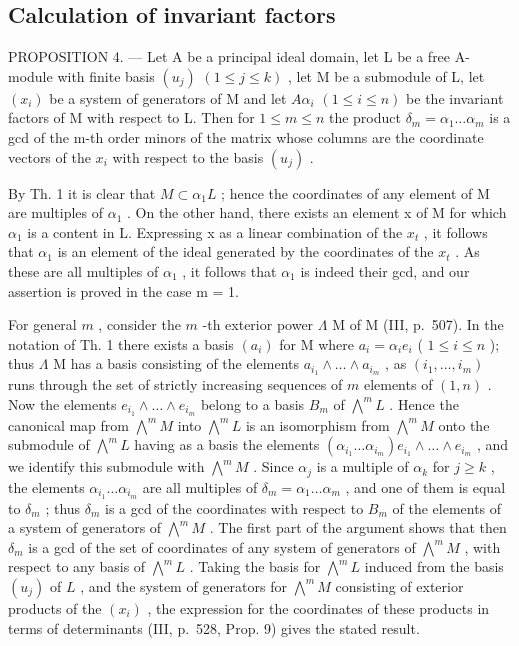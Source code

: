 \subsection{Calculation of invariant factors}

PROPOSITION 4. --- Let A be a principal ideal domain, let L be a free A-module with finite basis \((u_{j})\) \((1 \leqslant j \leqslant k)\) , let M be a submodule of L, let \((x_{i})\) be a system of generators of M and let \(A\alpha_{i}\) \((1 \leqslant i \leqslant n)\) be the invariant factors of M with respect to L. Then for \(1 \leqslant m \leqslant n\) the product \(\delta_{m} = \alpha_{1} \ldots \alpha_{m}\) is a gcd of the m-th order minors of the matrix whose columns are the coordinate vectors of the \(x_{i}\) with respect to the basis \((u_{j})\) .

By Th. 1 it is clear that \(M \subset \alpha_{1}L\) ; hence the coordinates of any element of M are multiples of \(\alpha_{1}\) . On the other hand, there exists an element x of M for which \(\alpha_{1}\) is a content in L. Expressing x as a linear combination of the \(x_{t}\) , it follows that \(\alpha_{1}\) is an element of the ideal generated by the coordinates of the \(x_{t}\) . As these are all multiples of \(\alpha_{1}\) , it follows that \(\alpha_{1}\) is indeed their gcd, and our assertion is proved in the case m = 1.

For general \(m\) , consider the \(m\) -th exterior power \(\Lambda\) M of M (III, p.~507). In the notation of Th. 1 there exists a basis \((a_i)\) for M where \(a_i = \alpha_i e_i\) ( \(1 \leqslant i \leqslant n\) ); thus \(\Lambda\) M has a basis consisting of the elements \(a_{i_1} \wedge \ldots \wedge a_{i_m}\) , as \((i_1, \ldots, i_m)\) runs through the set of strictly increasing sequences of \(m\) elements of \((1, n)\) . Now the elements \(e_{i_1} \wedge \ldots \wedge e_{i_m}\) belong to a basis \(B_m\) of \(\bigwedge^m L\) . Hence the canonical map from \(\bigwedge^m M\) into \(\bigwedge^m L\) is an isomorphism from \(\bigwedge^m M\) onto the submodule of \(\bigwedge^m L\) having as a basis the elements \((\alpha_{i_1} \ldots \alpha_{i_m}) e_{i_1} \wedge \ldots \wedge e_{i_m}\) , and we identify this submodule with \(\bigwedge^m M\) . Since \(\alpha_j\) is a multiple of \(\alpha_k\) for \(j \geqslant k\) , the elements \(\alpha_{i_1} \ldots \alpha_{i_m}\) are all multiples of \(\delta_m = \alpha_1 \ldots \alpha_m\) , and one of them is equal to \(\delta_m\) ; thus \(\delta_m\) is a gcd of the coordinates with respect to \(B_m\) of the elements of a system of generators of \(\bigwedge^m M\) . The first part of the argument shows that then \(\delta_m\) is a gcd of the set of coordinates of any system of generators of \(\bigwedge^m M\) , with respect to any basis of \(\bigwedge^m L\) . Taking the basis for \(\bigwedge^m L\) induced from the basis \((u_j)\) of \(L\) , and the system of generators for \(\bigwedge^m M\) consisting of exterior products of the \((x_i)\) , the expression for the coordinates of these products in terms of determinants (III, p.~528, Prop. 9) gives the stated result.

